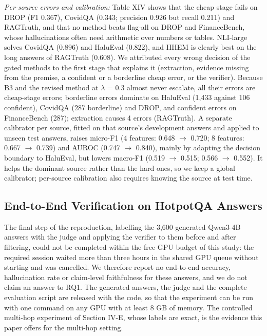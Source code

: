\documentclass[conference]{IEEEtran}
\begin{document}
\textit{Per-source errors and calibration:} Table XIV shows that the cheap stage fails on DROP (F1 0.367), CovidQA (0.343; precision 0.926 but recall 0.211) and RAGTruth, and that no method beats flag-all on DROP and FinanceBench, whose hallucinations often need arithmetic over numbers or tables. NLI-large solves CovidQA (0.896) and HaluEval (0.822), and HHEM is clearly best on the long answers of RAGTruth (0.608). We attributed every wrong decision of the gated methods to the first stage that explains it (extraction, evidence missing from the premise, a confident or a borderline cheap error, or the verifier). Because B3 and the revised method at $\lambda$ = 0.3 almost never escalate, all their errors are cheap-stage errors; borderline errors dominate on HaluEval (1,433 against 106 confident), CovidQA (287 borderline) and DROP, and confident errors on FinanceBench (287); extraction causes 4 errors (RAGTruth). A separate calibrator per source, fitted on that source's development answers and applied to unseen test answers, raises micro-F1 (4 features: 0.648 $\rightarrow$ 0.720; 8 features: 0.667 $\rightarrow$ 0.739) and AUROC (0.747 $\rightarrow$ 0.840), mainly by adapting the decision boundary to HaluEval, but lowers macro-F1 (0.519 $\rightarrow$ 0.515; 0.566 $\rightarrow$ 0.552). It helps the dominant source rather than the hard ones, so we keep a global calibrator; per-source calibration also requires knowing the source at test time.

\subsection{End-to-End Verification on HotpotQA Answers}

The final step of the reproduction, labelling the 3,600 generated Qwen3-4B answers with the judge and applying the verifier to them before and after filtering, could not be completed within the free GPU budget of this study: the required session waited more than three hours in the shared GPU queue without starting and was cancelled. We therefore report no end-to-end accuracy, hallucination rate or claim-level faithfulness for these answers, and we do not claim an answer to RQ1. The generated answers, the judge and the complete evaluation script are released with the code, so that the experiment can be run with one command on any GPU with at least 8 GB of memory. The controlled multi-hop experiment of Section IV-E, whose labels are exact, is the evidence this paper offers for the multi-hop setting.
\end{document}
